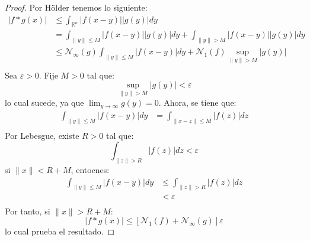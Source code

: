 \documentclass[12pt]{report}
\theoremstyle{largebreak}
\newcommand\abs[1]{\ensuremath{\big|#1\big|}}
\newcommand\norm[1]{\ensuremath{\|#1\|}}
\newcommand{\N}[2]{\ensuremath{\mathcal{N}_{#1}\left(#2\right)}}
\begin{document}
    \begin{proof}
        Por Hölder tenemos lo siguiente:
        \begin{equation*}
            \begin{split}
                \abs{f*g(x)}&\leq\int_{\mathbb{R}^n}\abs{f(x-y)}\abs{g(y)}dy\\
                &=\int_{\norm{y}\leq M }\abs{f(x-y)}\abs{g(y)}dy+\int_{\norm{y}>M}\abs{f(x-y)}\abs{g(y)}dy\\
                &\leq\N{\infty}{g}\int_{\norm{y}\leq M }\abs{f(x-y)}dy+\N{1}{f}\sup_{ \norm{y}>M}\abs{g(y)}\\
            \end{split}
        \end{equation*}
        Sea $\varepsilon>0$. Fije $M>0$ tal que:
        \begin{equation*}
            \sup_{ \norm{y}>M}\abs{g(y)}<\varepsilon
        \end{equation*}
        lo cual sucede, ya que $\lim_{y\rightarrow\infty} g(y)=0$. Ahora, se tiene que:
        \begin{equation*}
            \begin{split}
                \int_{\norm{y}\leq M } \abs{f(x-y)} dy &=\int_{\norm{x-z}\leq M }\abs{f(z)}dz\\
            \end{split}
        \end{equation*}
        Por Lebesgue, existe $R>0$ tal que:
        \begin{equation*}
            \int_{\norm{z}>R }\abs{f(z)}dz<\varepsilon
        \end{equation*}
        si $\norm{x}<R+M$, entocnes:
        \begin{equation*}
            \begin{split}
                \int_{\norm{y}\leq M } \abs{f(x-y)} dy &\leq\int_{\norm{z}>R }\abs{f(z)}dz\\
                &<\varepsilon\\
            \end{split}
        \end{equation*}
        Por tanto, si $\norm{x}>R+M$:
        \begin{equation*}
            \abs{f*g(x)}\leq\left[\N{1}{f}+\N{\infty}{g} \right]\varepsilon
        \end{equation*}
        lo cual prueba el resultado.
    \end{proof}
\end{document}
